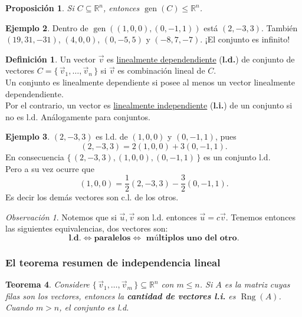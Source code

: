\documentclass[12pt]{article}
\theoremstyle{plain}
\newtheorem{Th}{Teorema}  %
\newtheorem{Prop}[Th]{Proposición}     %
\theoremstyle{definition}
\newtheorem*{Def}{Definición}       %
\newtheorem{Ex}[Th]{Ejemplo}           %
\theoremstyle{remark}
\newtheorem*{Rmk}{Observación}      %
\DeclareMathOperator{\gen}{gen}     %
\DeclareMathOperator{\Rng}{Rng}     %
\newcommand{\bR}{\mathbb{R}}        %
\renewcommand{\leq}{\leqslant}      %
\renewcommand{\:}{\colon}           %
\newcommand{\un}[1]{\underline{#1}}
\newcommand{\half}{\frac12}
\renewcommand{\.}{\Cdot}                %
\newcommand{\set}[1]{\{\,#1\,\}}    %
\begin{document}
\begin{multicols}{2}
\begin{Prop}
Si $C\subseteq\bR^n$, entonces $\gen(C)\leq \bR^n$.
\end{Prop}

\begin{Ex}
  Dentro de $\gen((1,0,0),(0,-1,1))$ está $(2,-3,3)$. También $(19,31,-31)$, $(4,0,0)$, $(0,-5,5)$ y $(-8,7,-7)$. ¡El conjunto es infinito!
\end{Ex}

\begin{Def}
  Un vector $\vec v$ es \un{linealmente dependendiente} (\textbf{l.d.}) de conjunto de vectores $C=\set{\vec{v}_1,\dots,\vec{v}_n}$ si $\vec{v}$ es combinación lineal de $C$.\\
  Un conjunto es linealmente dependiente si posee al menos un vector linealmente dependendiente.\\ 
  Por el contrario, un vector es \un{linealmente independiente} (\textbf{l.i.}) de un conjunto si no es l.d. Análogamente para conjuntos.
\end{Def}

\begin{Ex}
  $(2,-3,3)$ es l.d. de $(1,0,0)$ y $(0,-1,1)$, pues
  $$(2,-3,3)=2(1,0,0)+3(0,-1,1).$$
  En consecuencia $\set{(2,-3,3),(1,0,0),(0,-1,1)}$ es un conjunto l.d.\\
  Pero a su vez ocurre que 
  $$(1,0,0)=\half(2,-3,3)-\frac32(0,-1,1).$$
  Es decir los demás vectores son c.l. de los otros.
\end{Ex}

\begin{Rmk}
  Notemos que si $\vec u,\vec v$ son l.d. entonces $\vec u=c\vec v$. Tenemos entonces las siguientes equivalencias, dos vectores son:
 $$ \textbf{l.d.}\iff \textbf{paralelos}\iff\textbf{ múltiplos uno del otro}.$$
\end{Rmk}

\subsubsection*{El teorema resumen de independencia lineal}

\begin{Th}
  Considere $\set{\vec v_1,\dots,\vec{v}_m}\subseteq \bR^n$ con $m\leq n$. Si $A$ es la matriz cuyas filas son los vectores, entonces la \textbf{cantidad de vectores l.i.} es $\Rng(A)$.\\
  Cuando $m>n$, el conjunto es l.d.
\end{Th}


\end{multicols}
\end{document}
